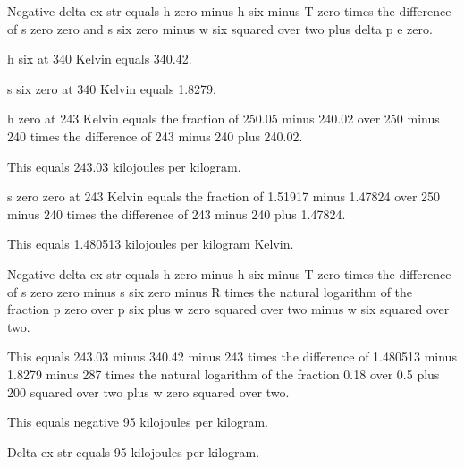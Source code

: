 Negative delta ex str equals h zero minus h six minus T zero times the difference of s zero zero and s six zero minus w six squared over two plus delta p e zero.

h six at 340 Kelvin equals 340.42.

s six zero at 340 Kelvin equals 1.8279.

h zero at 243 Kelvin equals the fraction of 250.05 minus 240.02 over 250 minus 240 times the difference of 243 minus 240 plus 240.02.

This equals 243.03 kilojoules per kilogram.

s zero zero at 243 Kelvin equals the fraction of 1.51917 minus 1.47824 over 250 minus 240 times the difference of 243 minus 240 plus 1.47824.

This equals 1.480513 kilojoules per kilogram Kelvin.

Negative delta ex str equals h zero minus h six minus T zero times the difference of s zero zero minus s six zero minus R times the natural logarithm of the fraction p zero over p six plus w zero squared over two minus w six squared over two.

This equals 243.03 minus 340.42 minus 243 times the difference of 1.480513 minus 1.8279 minus 287 times the natural logarithm of the fraction 0.18 over 0.5 plus 200 squared over two plus w zero squared over two.

This equals negative 95 kilojoules per kilogram.

Delta ex str equals 95 kilojoules per kilogram.
